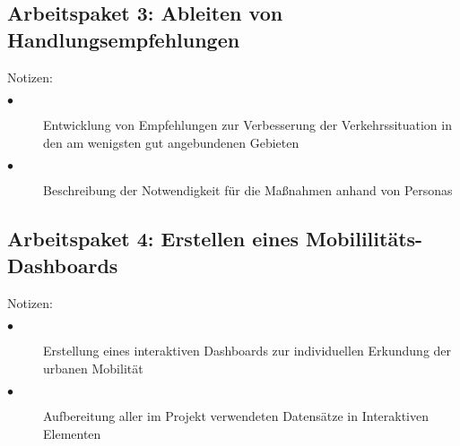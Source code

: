 \subsection{Arbeitspaket 3: Ableiten von Handlungsempfehlungen}
Notizen:
\begin{description}
    \item[$\bullet$] Entwicklung von Empfehlungen zur Verbesserung der Verkehrssituation in den am wenigsten gut angebundenen Gebieten
    \item[$\bullet$] Beschreibung der Notwendigkeit für die Maßnahmen anhand von Personas
  \end{description} 

\subsection{Arbeitspaket 4: Erstellen eines Mobililitäts-Dashboards}
Notizen: 
\begin{description}
    \item[$\bullet$] Erstellung eines interaktiven Dashboards zur individuellen Erkundung der urbanen Mobilität
    \item[$\bullet$] Aufbereitung aller im Projekt verwendeten Datensätze in Interaktiven Elementen
  \end{description} 

